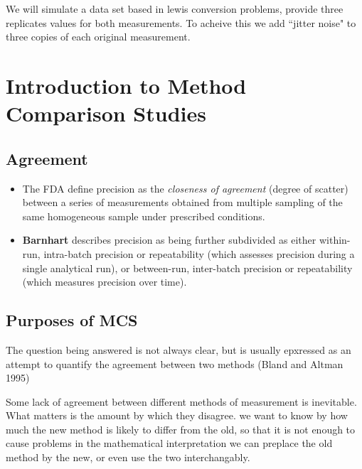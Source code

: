 \documentclass[12pt, a4paper]{report}
\theoremstyle{plain}
\theoremstyle{definition}
\theoremstyle{remark}
\begin{document}
We will simulate a data set based in lewis conversion problems, provide three replicates values for both measurements. To acheive this we add ``jitter noise" to three copies of each original measurement.



	
	


	

	\chapter{Introduction to Method Comparison Studies}



	\section{Agreement}
	\begin{itemize}
		\item The FDA define precision as the \textit{closeness of agreement} (degree of
		scatter) between a series of measurements obtained from multiple
		sampling of the same homogeneous sample under prescribed
		conditions. 
		\item \textbf{Barnhart} describes precision as being further
		subdivided as either within-run, intra-batch precision or
		repeatability (which assesses precision during a single analytical
		run), or between-run, inter-batch precision or repeatability
		(which measures precision over time).
	\end{itemize}
	


	\section{Purposes of MCS}
	
	The  question being answered is not always clear, but is usually epxressed as an attempt to quantify the agreement
	between two methods (Bland and Altman 1995)
	
	Some lack of agreement between different methods of measurement is inevitable. What matters is the amount by which they
	disagree. we want to know by how much the new method is likely to differ from the old, so that it is not enough to cause
	problems in the mathematical interpretation we can preplace the old method by the new, or even use the two interchangably.
	
\end{document}
